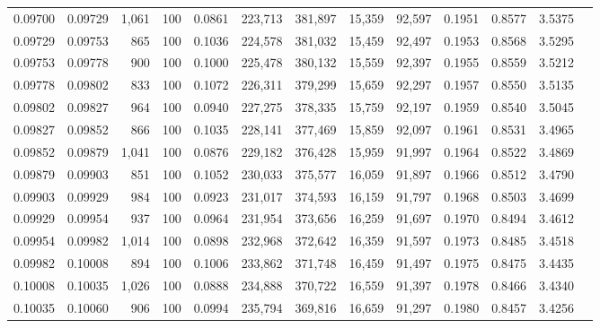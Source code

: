 \begin{tabular}{rrrrrrrrrrrrr}
0.09700 & 0.09729 & 1,061 & 100 &                                     0.0861 & 223,713 & 381,897 &  15,359 &  92,597 & 0.1951 & 0.8577 & 3.5375 \\
0.09729 & 0.09753 &   865 & 100 &                                     0.1036 & 224,578 & 381,032 &  15,459 &  92,497 & 0.1953 & 0.8568 & 3.5295 \\
0.09753 & 0.09778 &   900 & 100 &                                     0.1000 & 225,478 & 380,132 &  15,559 &  92,397 & 0.1955 & 0.8559 & 3.5212 \\
0.09778 & 0.09802 &   833 & 100 &                                     0.1072 & 226,311 & 379,299 &  15,659 &  92,297 & 0.1957 & 0.8550 & 3.5135 \\
0.09802 & 0.09827 &   964 & 100 &                                     0.0940 & 227,275 & 378,335 &  15,759 &  92,197 & 0.1959 & 0.8540 & 3.5045 \\
0.09827 & 0.09852 &   866 & 100 &                                     0.1035 & 228,141 & 377,469 &  15,859 &  92,097 & 0.1961 & 0.8531 & 3.4965 \\
0.09852 & 0.09879 & 1,041 & 100 &                                     0.0876 & 229,182 & 376,428 &  15,959 &  91,997 & 0.1964 & 0.8522 & 3.4869 \\
0.09879 & 0.09903 &   851 & 100 &                                     0.1052 & 230,033 & 375,577 &  16,059 &  91,897 & 0.1966 & 0.8512 & 3.4790 \\
0.09903 & 0.09929 &   984 & 100 &                                     0.0923 & 231,017 & 374,593 &  16,159 &  91,797 & 0.1968 & 0.8503 & 3.4699 \\
0.09929 & 0.09954 &   937 & 100 &                                     0.0964 & 231,954 & 373,656 &  16,259 &  91,697 & 0.1970 & 0.8494 & 3.4612 \\
0.09954 & 0.09982 & 1,014 & 100 &                                     0.0898 & 232,968 & 372,642 &  16,359 &  91,597 & 0.1973 & 0.8485 & 3.4518 \\
0.09982 & 0.10008 &   894 & 100 &                                     0.1006 & 233,862 & 371,748 &  16,459 &  91,497 & 0.1975 & 0.8475 & 3.4435 \\
0.10008 & 0.10035 & 1,026 & 100 &                                     0.0888 & 234,888 & 370,722 &  16,559 &  91,397 & 0.1978 & 0.8466 & 3.4340 \\
0.10035 & 0.10060 &   906 & 100 &                                     0.0994 & 235,794 & 369,816 &  16,659 &  91,297 & 0.1980 & 0.8457 & 3.4256 \\

\end{tabular}
